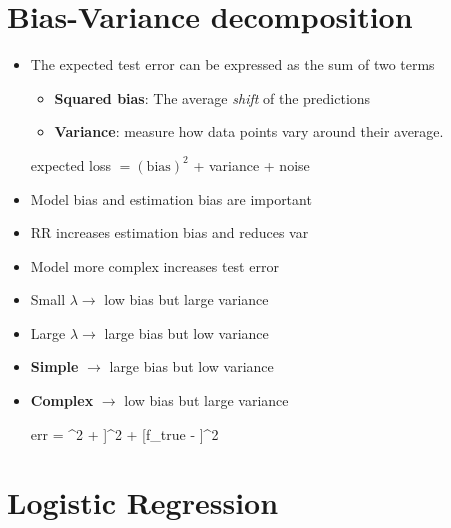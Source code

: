 \section{Bias-Variance decomposition}
\begin{itemize}
	\item The expected test error can be expressed as the sum of two terms
	\begin{itemize}
	 	\item \textbf{Squared bias}: The average \textit{shift} of the predictions 
	 	\item \textbf{Variance}: measure how data points vary around their average.
	 \end{itemize} 

	 	expected loss $= (\text{bias})^2$ + variance + noise
	 	
	\item Model bias and estimation bias are important
	\item RR increases estimation bias and reduces var
	\item Model more complex increases test error
	\item Small $\lambda \rightarrow$ low bias but large variance
	\item Large $\lambda \rightarrow$ large bias but low variance
	\item {\bf Simple} $\rightarrow$ large bias but low variance
	\item {\bf Complex} $\rightarrow$ low bias but large variance
	\begin{myalign*}
	    \hspace{-.3cm} err = \sigma^2 + \E[f_{lse} - \E[f_{lse}]]^2 + [f_{true} - \E[f_{lse}]]^2
	\end{myalign*}
\end{itemize}

\section{Logistic Regression}

